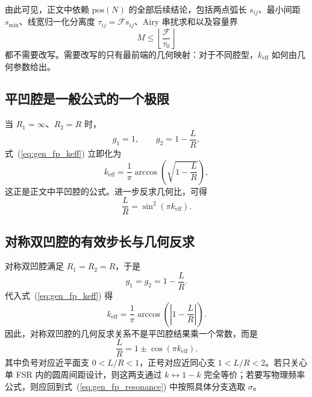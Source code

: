 由此可见，正文中依赖 $\mathrm{pos}(N)$ 的全部后续结论，包括两点弧长 $s_{ij}$、最小间距 $s_{\min}$、线宽归一化分离度 $\tau_{ij}=\mathcal{F}s_{ij}$、Airy 串扰求和以及容量界
\begin{equation}
M\le \left\lfloor \frac{\mathcal{F}}{\tau_0}\right\rfloor
\label{eq:gen_fp_capacity}
\end{equation}
都不需要改写。需要改写的只有最前端的几何映射：对于不同腔型，$k_{\mathrm{eff}}$ 如何由几何参数给出。

\subsection{平凹腔是一般公式的一个极限}

当 $R_1=\infty$、$R_2=R$ 时，
\begin{equation}
g_1=1,
\qquad
g_2=1-\frac{L}{R},
\end{equation}
式~(\ref{eq:gen_fp_keff}) 立即化为
\begin{equation}
k_{\mathrm{eff}}
=
\frac{1}{\pi}\arccos\!\left(\sqrt{1-\frac{L}{R}}\right),
\label{eq:gen_fp_plane_concave}
\end{equation}
这正是正文中平凹腔的公式。进一步反求几何比，可得
\begin{equation}
\frac{L}{R}=\sin^2(\pi k_{\mathrm{eff}}).
\label{eq:gen_fp_plane_concave_inverse}
\end{equation}

\subsection{对称双凹腔的有效步长与几何反求}

对称双凹腔满足 $R_1=R_2=R$，于是
\begin{equation}
g_1=g_2=1-\frac{L}{R}.
\end{equation}
代入式~(\ref{eq:gen_fp_keff}) 得
\begin{equation}
k_{\mathrm{eff}}
=
\frac{1}{\pi}\arccos\!\left(\left|1-\frac{L}{R}\right|\right).
\label{eq:gen_fp_symmetric_keff}
\end{equation}
因此，对称双凹腔的几何反求关系不是平凹腔结果乘一个常数，而是
\begin{equation}
\frac{L}{R}=1\pm \cos(\pi k_{\mathrm{eff}}).
\label{eq:gen_fp_symmetric_inverse}
\end{equation}
其中负号对应近平面支 $0<L/R<1$，正号对应近同心支 $1<L/R<2$。若只关心单 FSR 内的圆周间距设计，则这两支通过 $k\leftrightarrow 1-k$ 完全等价；若要写物理频率公式，则应回到式~(\ref{eq:gen_fp_resonance}) 中按照具体分支选取 $\sigma$。

